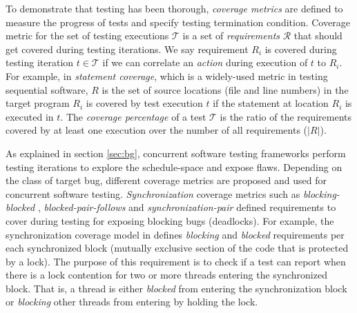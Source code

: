 %
To demonstrate that testing has been thorough, \textit{coverage metrics} are defined to measure the progress of tests and specify testing termination condition.
%
Coverage metric for the set of testing executions $\mathcal{T}$ is a set of \textit{requirements} $\mathcal{R}$ that should get covered during testing iterations.
%
We say requirement $R_i$ is covered during testing iteration $t \in \mathcal{T}$ if we can correlate an \textit{action} during execution of $t$ to $R_i$.
%
For example, in \textit{statement coverage}, which is a widely-used metric in testing sequential software, $R$ is the set of source locations (file and line numbers) in the target program
%
$R_i$ is covered by test execution $t$ if the statement at location $R_i$ is executed in $t$.
%
The \textit{coverage percentage} of a test $\mathcal{T}$ is the ratio of the requirements covered by at least one execution over the number of all requirements ($|R|$).

As explained in section \ref{sec:bg}, concurrent software testing frameworks perform testing iterations to explore the schedule-space and expose flaws.
%
Depending on the class of target bug, different coverage metrics are proposed and used for concurrent software testing.
%
\textit{Synchronization} coverage metrics such as \textit{blocking-blocked} \cite{edelstein2003contest}, \textit{blocked-pair-follows} \cite{trainin-followsCoverage-padtad09} and \textit{synchronization-pair} \cite{hong-syncTesting-issta12} defined requirements to cover during testing for exposing blocking bugs (\eg deadlocks).
%
%
For example, the synchronization coverage model in \cite{edelstein2003contest} defines \textit{blocking} and \textit{blocked} requirements per each synchronized block (\ie mutually exclusive section of the code that is protected by a lock).
%
The purpose of this requirement is to check if a test can report when there is a lock contention for two or more threads entering the synchronized block.
%
That is, a thread is either \textit{blocked} from entering the synchronization block or \textit{blocking} other threads from entering by holding the lock.
%

